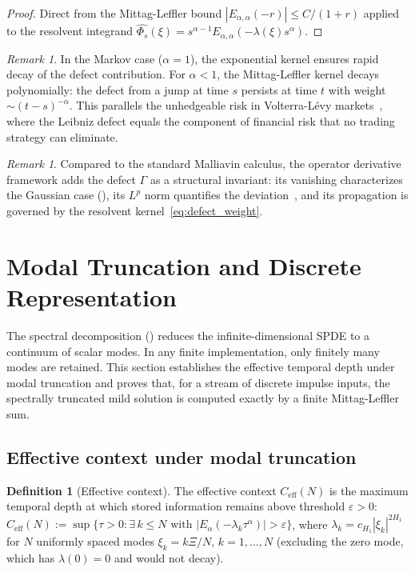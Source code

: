 \documentclass[11pt]{article}
\theoremstyle{definition}
\newtheorem{definition}[theorem]{Definition}
\theoremstyle{remark}
\newtheorem{remark}[theorem]{Remark}
\begin{document}
\begin{proof}
Direct from the Mittag-Leffler bound
$|E_{\alpha,\alpha}(-r)| \leq C/(1+r)$ applied to the
resolvent integrand
$\widehat{\Phi_s}(\xi)
= s^{\alpha-1}
E_{\alpha,\alpha}(-\lambda(\xi) s^\alpha)$.
\end{proof}

\begin{remark}
In the Markov case ($\alpha = 1$), the exponential
kernel ensures rapid decay of the defect contribution.
For $\alpha < 1$, the Mittag-Leffler kernel decays
polynomially: the defect from a jump at time $s$
persists at time $t$ with weight
$\sim (t-s)^{-\alpha}$.
This parallels the unhedgeable risk in
Volterra-L\'evy markets~\cite{fontes2026volterra},
where the Leibniz defect equals the component of
financial risk that no trading strategy can eliminate.
\end{remark}

\begin{remark}
\label{rem:what_D_adds}
Compared to the standard Malliavin calculus, the
operator derivative framework adds the defect
$\Gamma$ as a structural invariant: its vanishing
characterizes the Gaussian case
(), its $L^p$ norm
quantifies the deviation~\cite{fontes2026volterra},
and its propagation is governed by the resolvent
kernel~\eqref{eq:defect_weight}.
\end{remark}

\section{Modal Truncation and Discrete Representation}
\label{sec:discrete}

The spectral decomposition () reduces
the infinite-dimensional SPDE to a continuum of scalar
modes.  In any finite implementation, only finitely many
modes are retained.  This section establishes the
effective temporal depth under modal truncation and
proves that, for a stream of discrete impulse inputs,
the spectrally truncated mild solution is computed
exactly by a finite Mittag-Leffler sum.

\subsection{Effective context under modal truncation}

\begin{definition}[Effective context]
\label{def:eff_context}
The effective context $C_{\mathrm{eff}}(N)$ is the
maximum temporal depth at which stored information
remains above threshold $\varepsilon > 0$:
$C_{\mathrm{eff}}(N) := \sup\{\tau > 0 :
\exists\, k \leq N \text{ with }
|E_\alpha(-\lambda_k \tau^\alpha)| > \varepsilon\}$,
where $\lambda_k = c_{H_1}|\xi_k|^{2H_1}$ for
$N$ uniformly spaced modes
$\xi_k = k\Xi/N$, $k = 1, \ldots, N$ (excluding the
zero mode, which has $\lambda(0) = 0$ and would not
decay).
\end{definition}
\end{document}
